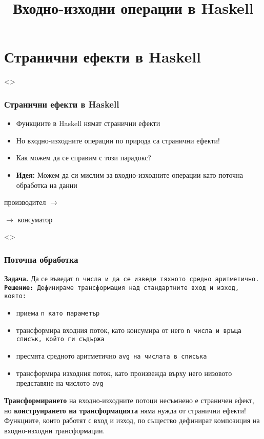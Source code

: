 \documentclass[alsotrans,beameroptions={aspectratio=169}]{beamerswitch}
\title{Входно-изходни операции в Haskell\ifbool{parts}{ -- част \ifbool{part1}{1}{}\ifbool{part2}{2}{}}{}}
\date[\ifbool{part1}{29.11--4.12.2024 г.}{}]{\ifbool{part1}{29 ноември--4 декември 2024 г.}{}}
\begin{document}
\begin{frame}
  \titlepage
\end{frame}

\section{Странични ефекти в Haskell}

\begin{frame}<>
  \frametitle{Странични ефекти в Haskell}

  \begin{itemize}[<+->]
  \item Функциите в Haskell нямат странични ефекти
  \item Но входно-изходните операции по природа са странични ефекти!
  \item Как можем да се справим с този парадокс?
  \item \textbf{Идея:} Можем да си мислим за входно-изходните операции като поточна обработка на данни
  \end{itemize}
  \onslide<+->
  \begin{center}
    производител
    $\longrightarrow$
     $\longrightarrow$ консуматор
  \end{center}
\end{frame}

\begin{frame}<>
  \frametitle{Поточна обработка}
  \textbf{Задача.} Да се въведат \tt{n} числа и да се изведе тяхното средно аритметично.\\
  \pause
  \textbf{Решение:} Дефинираме трансформация над стандартните вход и изход, която:
  \begin{itemize}[<+->]
  \item приема \tt{n} като параметър
  \item трансформира входния поток, като \alert{консумира} от него \tt{n} числа и връща списък, който ги съдържа
  \item пресмята средното аритметично \tt{avg} на числата в списъка
  \item трансформира изходния поток, като \alert{произвежда} върху него низовото представяне на числото \tt{avg}
  \end{itemize}
  \onslide<+->
  \textbf{Трансформирането} на входно-изходните потоци несъмнено е страничен ефект, но \textbf{конструирането на трансформацията} няма нужда от странични ефекти!\\
  \onslide<+->
  \alert{Функциите, които работят с вход и изход, по същество дефинират композиция на входно-изходни трансформации.}
\end{frame}
\end{document}
